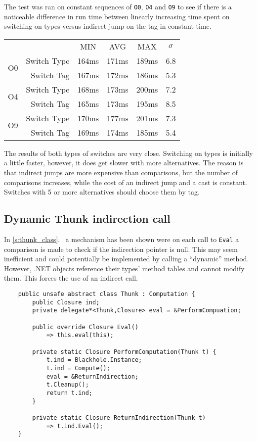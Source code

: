 \documentclass[en]{pracamgr}
\newcommand{\myref}[1]{\ref{#1}.~\textit{\nameref{#1}}}
\begin{document}
The test was ran on constant sequences of
\texttt{O0}, \texttt{O4} and \texttt{O9} to see
if there is a noticeable difference in run time
between linearly increasing time spent on switching on types
versus indirect jump on the tag in constant time.

\begin{center}
\begin{tabular}{c r c c c c}
    & & MIN & AVG & MAX & $\sigma$ \\
    \cline{3-6}
        
    \multirow{2}{*}{O0} & Switch Type & 164ms & 171ms & 189ms & 6.8 \\
    & Switch Tag & 167ms & 172ms & 186ms & 5.3 \\
    \cline{2-6}

    \multirow{2}{*}{O4} & Switch Type & 168ms & 173ms & 200ms & 7.2 \\
    & Switch Tag & 165ms & 173ms & 195ms & 8.5 \\
    \cline{2-6}

    \multirow{2}{*}{O9} & Switch Type & 170ms & 177ms & 201ms & 7.3 \\
    & Switch Tag & 169ms & 174ms & 185ms & 5.4 \\
\end{tabular}
\end{center}

The results of both types of switches are very close.
Switching on types is initially a little faster, however,
it does get slower with more alternatives.
The reason is that indirect jumps are more expensive than comparisons,
but the number of comparisons increases, while the cost of
an indirect jump and a cast is constant.
Switches with 5 or more alternatives should choose them by tag.

\subsection{Dynamic Thunk indirection call}\label{perf:thunk_ind}

In \myref{s:thunk_class} a mechanism has been shown were
on each call to \texttt{Eval} a comparison is made to
check if the indirection pointer is null.
This may seem inefficient and could potentially be implemented
by calling a ``dynamic'' method.
However, .NET objects reference their types' method tables
and cannot modify them. This forces the use of an indirect call.

\begin{verbatim}
    public unsafe abstract class Thunk : Computation {
        public Closure ind;
        private delegate*<Thunk,Closure> eval = &PerformCompuation;
        
        public override Closure Eval()
            => this.eval(this);
        
        private static Closure PerformComputation(Thunk t) {
            t.ind = Blackhole.Instance;
            t.ind = Compute();
            eval = &ReturnIndirection;
            t.Cleanup();
            return t.ind;
        }

        private static Closure ReturnIndirection(Thunk t)
            => t.ind.Eval();
    }
\end{verbatim}
\end{document}
